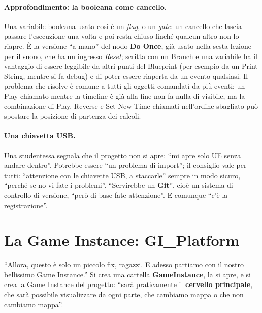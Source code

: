 \paragraph{Approfondimento: la booleana come cancello.} Una variabile booleana usata così
è un \emph{flag}, o un \emph{gate}: un cancello che lascia passare l'esecuzione una volta
e poi resta chiuso finché qualcun altro non lo riapre. È la versione ``a mano'' del nodo
\textbf{Do Once}, già usato nella sesta lezione per il suono, che ha un ingresso
\emph{Reset}; scritta con un Branch e una variabile ha il vantaggio di essere leggibile
da altri punti del Blueprint (per esempio da un Print String, mentre si fa debug) e di
poter essere riaperta da un evento qualsiasi. Il problema che risolve è comune a tutti
gli oggetti comandati da più eventi: un Play chiamato mentre la timeline è già alla fine
non fa nulla di visibile, ma la combinazione di Play, Reverse e Set New Time chiamati
nell'ordine sbagliato può spostare la posizione di partenza dei calcoli.

\paragraph{Una chiavetta USB.} Una studentessa segnala che il progetto non si apre:
``mi apre solo UE senza andare dentro''. Potrebbe essere ``un problema di import''; il
consiglio vale per tutti: ``attenzione con le chiavette USB, a staccarle'' sempre in modo
sicuro, ``perché se no vi fate i problemi''. ``Servirebbe un \textbf{Git}'', cioè un
sistema di controllo di versione, ``però di base fate attenzione''. E comunque ``c'è la
registrazione''.

\section{La Game Instance: GI\_Platform}
\label{ue8:sec:gi}

``Allora, questo è solo un piccolo fix, ragazzi. E adesso partiamo con il nostro
bellissimo Game Instance.'' Si crea una cartella \textbf{GameInstance}, la si apre, e si
crea la Game Instance del progetto: ``sarà praticamente il \textbf{cervello principale},
che sarà possibile visualizzare da ogni parte, che cambiamo mappa o che non cambiamo
mappa''.

